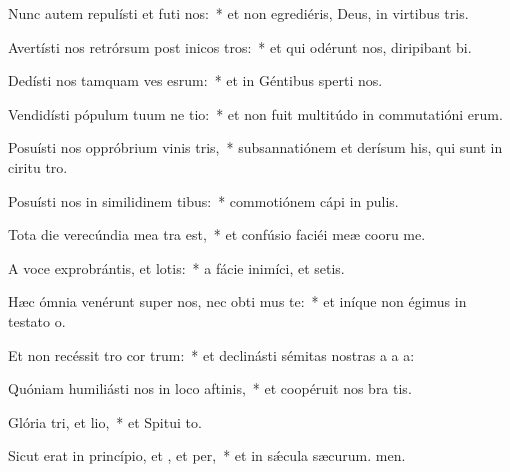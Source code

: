 \item Nunc autem repulísti et futi nos:~* et non egrediéris, Deus, in virtibus tris.
\item Avertísti nos retrórsum post inicos tros:~* et qui odérunt nos, diripibant bi.
\item Dedísti nos tamquam ves esrum:~* et in Géntibus sperti nos.
\item Vendidísti pópulum tuum ne tio:~* et non fuit multitúdo in commutatióni erum.
\item Posuísti nos oppróbrium vinis tris,~* subsannatiónem et derísum his, qui sunt in ciritu tro.
\item Posuísti nos in similidinem tibus:~* commotiónem cápi in pulis.
\item Tota die verecúndia mea tra  est,~* et confúsio faciéi meæ cooru me.
\item A voce exprobrántis, et lotis:~* a fácie inimíci, et setis.
\item Hæc ómnia venérunt super nos, nec obti mus te:~* et iníque non égimus in testato o.
\item Et non recéssit tro cor trum:~* et declinásti sémitas nostras a a a:
\item Quóniam humiliásti nos in loco aftinis,~* et coopéruit nos bra tis.
\item Glória tri, et lio,~* et Spitui to.
\item Sicut erat in princípio, et , et per,~* et in sǽcula sæcurum. men.
